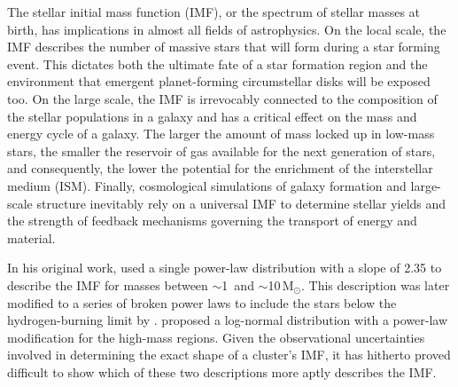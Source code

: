 \documentclass{aa}
\newcommand{\msune}{M$_\odot$}
\newcommand{\s}{$\sim$}
\begin{document}
The stellar initial mass function (IMF), or the spectrum of stellar masses at birth, has implications in almost all fields of astrophysics.
On the local scale, the IMF describes the number of massive stars that will form during a star forming event.
This dictates both the ultimate fate of a star formation region and the environment that emergent planet-forming circumstellar disks will be exposed too.
On the large scale, the IMF is irrevocably connected to the composition of the stellar populations in a galaxy and has a critical effect on the mass and energy cycle of a galaxy.
The larger the amount of mass locked up in low-mass stars, the smaller the reservoir of gas available for the next generation of stars, and consequently, the lower the potential for the enrichment of the interstellar medium (ISM).
Finally, cosmological simulations of galaxy formation and large-scale structure inevitably rely on a universal IMF to determine stellar yields and the strength of feedback mechanisms governing the transport of energy and material.

In his original work, \citet{salpeter1955} used a single power-law distribution with a slope of 2.35 to describe the IMF for masses between \s1\ and \s10\,\msune.
This description was later modified to a series of broken power laws to include the stars below the hydrogen-burning limit by \citet{kroupa2001}\@.
\citet{chabrier2003, Chabrier2005} proposed a log-normal distribution with a power-law modification for the high-mass regions.
Given the observational uncertainties involved in determining the exact shape of a cluster's IMF, it has hitherto proved difficult to show which of these two descriptions more aptly describes the IMF\@.
\end{document}
